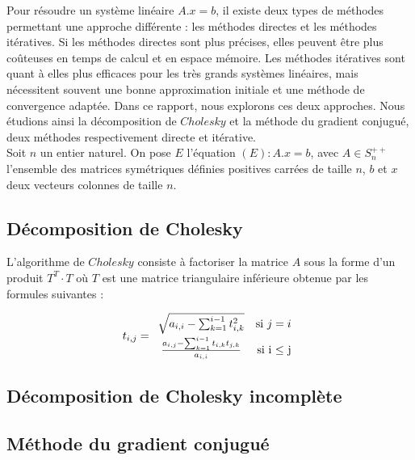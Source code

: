 \documentclass{article}
\begin{document}
Pour résoudre un système linéaire $A.x = b$, il existe deux types de méthodes permettant une approche différente : les méthodes directes et les méthodes itératives. Si les méthodes directes sont plus précises, elles peuvent être plus coûteuses en temps de calcul et en espace mémoire.
Les méthodes itératives sont quant à elles plus efficaces pour les très grands systèmes linéaires, mais nécessitent souvent une bonne approximation initiale et une méthode de convergence adaptée. 
Dans ce rapport, nous explorons ces deux approches. Nous étudions ainsi la décomposition de $Cholesky$ et la méthode du gradient conjugué, deux méthodes respectivement directe et itérative. \\

Soit $n$ un entier naturel. On pose $E$ l'équation $(E) : A.x = b$, avec $A \in S_n^{++}$ l'ensemble des matrices symétriques définies positives carrées de taille $n$, $b$ et $x$ deux vecteurs colonnes de taille $n$.\\

\subsection{Décomposition de Cholesky}

L'algorithme de $Cholesky$ consiste à factoriser la matrice $A$ sous la forme d’un produit $ T^{T} \cdot T$ où $T$
est une matrice triangulaire inférieure obtenue par les formules suivantes :

\begin{equation*}
t_{i, j} = 
    \begin{array}{cr}
        \rule{0pt}{2.5ex} \sqrt{ a_{i,i} - \sum_{k=1}^{i-1} t_{i,k}^{2}} & \mbox{si } j=i \\
        \rule{0pt}{4ex} \frac{ a_{i,j} - \sum_{k=1}^{i-1} t_{i,k}t_{j,k} } {a_{i,i}}& \mbox{si i $\leq$ j}
    \end{array}
\end{equation*}

\subsection{Décomposition de Cholesky incomplète}


\subsection{Méthode du gradient conjugué}
\end{document}
